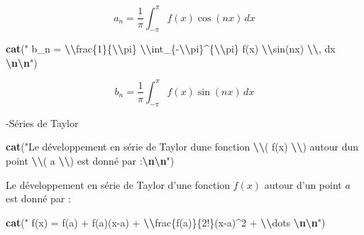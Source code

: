 \documentclass[
]{article}
\newenvironment{Shaded}{\begin{snugshade}}{\end{snugshade}}
\newcommand{\FunctionTok}[1]{\textcolor[rgb]{0.13,0.29,0.53}{\textbf{#1}}}
\newcommand{\NormalTok}[1]{#1}
\newcommand{\SpecialCharTok}[1]{\textcolor[rgb]{0.81,0.36,0.00}{\textbf{#1}}}
\newcommand{\StringTok}[1]{\textcolor[rgb]{0.31,0.60,0.02}{#1}}
\begin{document}
\[ a_n = \frac{1}{\pi} \int_{-\pi}^{\pi} f(x) \cos(nx) \, dx \]

\begin{Shaded}
\begin{Highlighting}[]
\FunctionTok{cat}\NormalTok{(}\StringTok{"$$ b\_n = }\SpecialCharTok{\textbackslash{}\textbackslash{}}\StringTok{frac\{1\}\{}\SpecialCharTok{\textbackslash{}\textbackslash{}}\StringTok{pi\} }\SpecialCharTok{\textbackslash{}\textbackslash{}}\StringTok{int\_\{{-}}\SpecialCharTok{\textbackslash{}\textbackslash{}}\StringTok{pi\}\^{}\{}\SpecialCharTok{\textbackslash{}\textbackslash{}}\StringTok{pi\} f(x) }\SpecialCharTok{\textbackslash{}\textbackslash{}}\StringTok{sin(nx) }\SpecialCharTok{\textbackslash{}\textbackslash{}}\StringTok{, dx $$}\SpecialCharTok{\textbackslash{}n\textbackslash{}n}\StringTok{"}\NormalTok{)}
\end{Highlighting}
\end{Shaded}

\[ b_n = \frac{1}{\pi} \int_{-\pi}^{\pi} f(x) \sin(nx) \, dx \]

-Séries de Taylor

\begin{Shaded}
\begin{Highlighting}[]
\FunctionTok{cat}\NormalTok{(}\StringTok{"Le développement en série de Taylor d\textquotesingle{}une fonction }\SpecialCharTok{\textbackslash{}\textbackslash{}}\StringTok{( f(x) }\SpecialCharTok{\textbackslash{}\textbackslash{}}\StringTok{) autour d\textquotesingle{}un point }\SpecialCharTok{\textbackslash{}\textbackslash{}}\StringTok{( a }\SpecialCharTok{\textbackslash{}\textbackslash{}}\StringTok{) est donné par :}\SpecialCharTok{\textbackslash{}n\textbackslash{}n}\StringTok{"}\NormalTok{)}
\end{Highlighting}
\end{Shaded}

Le développement en série de Taylor d'une fonction \(f(x)\) autour d'un
point \(a\) est donné par :

\begin{Shaded}
\begin{Highlighting}[]
\FunctionTok{cat}\NormalTok{(}\StringTok{"$$ f(x) = f(a) + f\textquotesingle{}(a)(x{-}a) + }\SpecialCharTok{\textbackslash{}\textbackslash{}}\StringTok{frac\{f\textquotesingle{}\textquotesingle{}(a)\}\{2!\}(x{-}a)\^{}2 + }\SpecialCharTok{\textbackslash{}\textbackslash{}}\StringTok{dots $$}\SpecialCharTok{\textbackslash{}n\textbackslash{}n}\StringTok{"}\NormalTok{)}
\end{Highlighting}
\end{Shaded}
\end{document}
